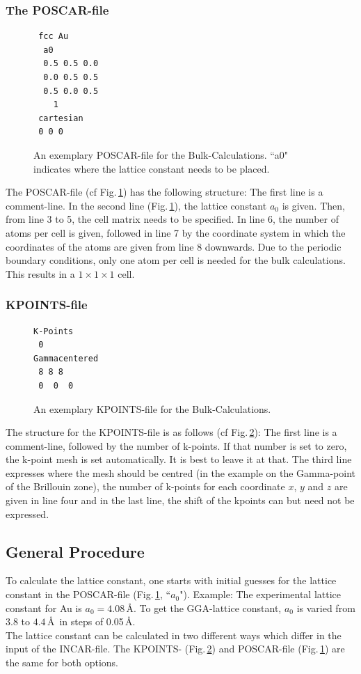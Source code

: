 \documentclass[twoside, 11pt, titlepage, captions=nooneline, a4paper, headsepline]{scrbook}%
\begin{document}
\subsubsection*{The POSCAR-file}
\begin{figure}[h!]
\begin{verbatim}
 fcc Au
  a0
  0.5 0.5 0.0
  0.0 0.5 0.5
  0.5 0.0 0.5
    1
 cartesian
 0 0 0
\end{verbatim}
\caption{An exemplary POSCAR-file for the Bulk-Calculations. ``a0" indicates where the lattice constant needs to be placed.}
\label{bposcar}
\end{figure}
The POSCAR-file (cf Fig.\,\ref{bposcar}) has the following structure: The first line is a comment-line. In the second line (Fig.\,\ref{bposcar}), the lattice constant $a_0$ is given. Then, from line 3 to 5, the cell matrix needs to be specified. In line 6, the number of atoms per cell is given, followed in line 7 by the coordinate system in which the coordinates of the atoms are given from line 8 downwards. Due to the periodic boundary conditions, only one atom per cell is needed for the bulk calculations. This results in a $1\times1\times1$ cell.
\subsubsection*{KPOINTS-file}
\begin{figure}[h!]
\begin{verbatim}
K-Points
 0
Gammacentered
 8 8 8
 0  0  0
\end{verbatim}
\caption{An exemplary KPOINTS-file for the Bulk-Calculations.}
\label{bkp}
\end{figure}
\noindent The structure for the KPOINTS-file is as follows (cf Fig.\,\ref{bkp}): The first line is a comment-line, followed by the number of k-points. If that number is set to zero, the k-point mesh is set automatically. It is best to leave it at that. The third line expresses where the mesh should be centred (in the example on the Gamma-point of the Brillouin zone), the number of k-points for each coordinate $x$, $y$ and $z$ are given in line four and in the last line, the shift of the kpoints can but need not be expressed.\\
\subsection{General Procedure}
To calculate the lattice constant, one starts with initial guesses for the lattice constant in the POSCAR-file (Fig.\,\ref{bposcar}, ``$a_0$"). Example: The experimental lattice constant for Au is $a_0=4.08$\,\AA. To get the GGA-lattice constant, $a_0$ is varied from $3.8$ to $4.4$\,\AA~in steps of 0.05\,\AA.\\
The lattice constant can be calculated in two different ways which differ in the input of the INCAR-file. The KPOINTS- (Fig.\,\ref{bkp}) and POSCAR-file (Fig.\,\ref{bposcar}) are the same for both options.
\end{document}
